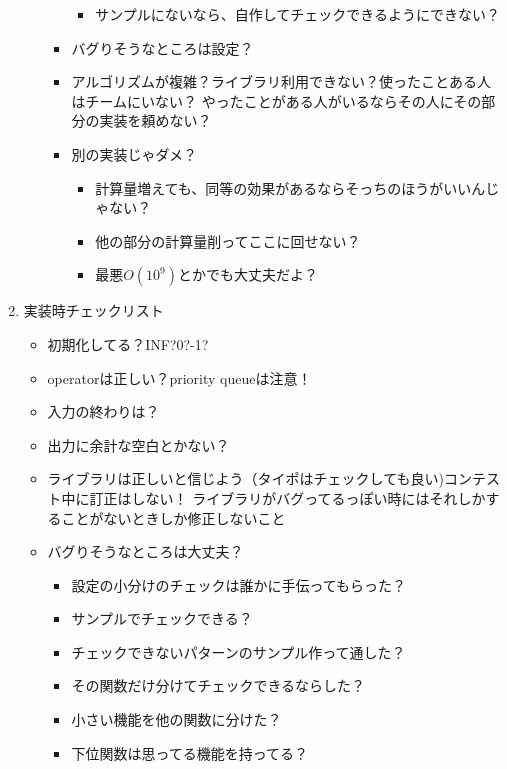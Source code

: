 \documentclass{jsarticle}
\begin{document}
\begin{enumerate}
\begin{itemize}
\begin{itemize}
\begin{itemize}
        \item サンプルにないなら、自作してチェックできるようにできない？
      \end{itemize}
      \item バグりそうなところは設定？
      \item アルゴリズムが複雑？ライブラリ利用できない？使ったことある人はチームにいない？
        \newline やったことがある人がいるならその人にその部分の実装を頼めない？
      \item 別の実装じゃダメ？
      \begin{itemize}
          \item 計算量増えても、同等の効果があるならそっちのほうがいいんじゃない？
          \item 他の部分の計算量削ってここに回せない？
          \item 最悪$O(10^{9})$とかでも大丈夫だよ？
      \end{itemize}
    \end{itemize}
  \end{itemize}
  
  \clearpage
  \item 実装時チェックリスト
  \begin{itemize}
    \item 初期化してる？INF?0?-1?
    \item operatorは正しい？priority queueは注意！
    \item 入力の終わりは？
    \item 出力に余計な空白とかない？
    \item ライブラリは正しいと信じよう（タイポはチェックしても良い)コンテスト中に訂正はしない！
      \newline ライブラリがバグってるっぽい時にはそれしかすることがないときしか修正しないこと
    \item バグりそうなところは大丈夫？
    \begin{itemize}
      \item 設定の小分けのチェックは誰かに手伝ってもらった？
      \item サンプルでチェックできる？
      \item チェックできないパターンのサンプル作って通した？
      \item その関数だけ分けてチェックできるならした？
      \item 小さい機能を他の関数に分けた？
      \item 下位関数は思ってる機能を持ってる？
    \end{itemize}
  \end{itemize}
\end{enumerate}
\end{document}
